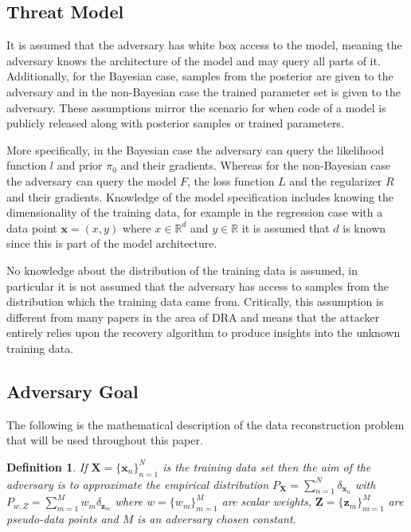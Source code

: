 \documentclass[hyperref]{article}
\theoremstyle{plain}
\newtheorem{definition}[theorem]{Definition}
\theoremstyle{remark}
\newcommand{\bx}{\mathbf{x}}
\newcommand{\bz}{\mathbf{z}}
\newcommand{\bX}{\mathbf{X}}
\newcommand{\bZ}{\mathbf{Z}}
\newcommand{\bbR}{\mathbb{R}}
\begin{document}
\subsection{Threat Model} It is assumed that the adversary has white box access to the model, meaning the adversary knows the architecture of the model and may query all parts of it. Additionally, for the Bayesian case, samples from the posterior are given to the adversary and in the non-Bayesian case the trained parameter set is given to the adversary. These assumptions mirror the scenario for when code of a model is publicly released along with posterior samples or trained parameters. 

More specifically, in the Bayesian case the adversary can query the likelihood function $l$ and prior $\pi_{0}$ and their gradients. Whereas for the non-Bayesian case the adversary can query the model $F$, the loss function $L$ and the regularizer $R$ and their gradients. Knowledge of the model specification includes knowing the dimensionality of the training data, for example in the regression case with a data point $\bx = (x,y)$ where $x\in\bbR^{d}$ and $y\in\bbR$ it is assumed that $d$ is known since this is part of the model architecture. 

No knowledge about the distribution of the training data is assumed, in particular it is not assumed that the adversary has access to samples from the distribution which the training data came from. Critically, this assumption is different from many papers in the area of DRA \citet{Kaissis2023_hypothesis,Balle2022_informed,Hayes203_dpsgd} and means that the attacker entirely relies upon the recovery algorithm to produce insights into the unknown training data. 

\subsection{Adversary Goal} 
The following is the mathematical description of the data reconstruction problem that will be used throughout this paper. 
\begin{definition}\label{def:goal}
	If $\bX = \{\bx_{n}\}_{n=1}^{N}$ is the training data set then the aim of the adversary is to approximate the empirical distribution $P_{\bX} = \sum_{n=1}^{N}\delta_{\bx_{n}}$ with $P_{w,Z} = \sum_{m=1}^{M}w_{m}\delta_{\bz_{m}}$ where $w = \{w_{m}\}_{m=1}^{M}$ are scalar weights, $\bZ = \{\bz_{m}\}_{m=1}^{M}$ are pseudo-data points and $M$ is an adversary chosen constant.
\end{definition} 
\end{document}
